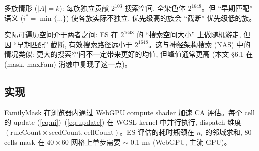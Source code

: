 多族情形 ($|A| = k$): 每族独立贡献 $2^{103}$ 搜索空间, 全染色体 $2^{1648}$。但 ``早期匹配'' 语义 ($i^* = \min\{\ldots\}$) 使各族实际不独立, 优先级高的族会 ``截断'' 优先级低的族。

实际可遍历空间介于两者之间: ES 在 $2^{1648}$ 的 ``搜索空间大小'' 上做随机游走, 但因 ``早期匹配'' 截断, 有效搜索路径远小于 $2^{1648}$。这与神经架构搜索 (NAS) 中的情况类似: 更大的搜索空间不一定带来更好的均值, 但峰值通常更高 (本文 §6.1 在 (mask, maxFam) 消融中复现了这一点)。

\subsection{实现}

FamilyMask 在浏览器内通过 WebGPU compute shader 加速 CA 评估。每个 cell 的 update (\ref{eq:ni})--(\ref{eq:update}) 在 WGSL kernel 中并行执行, dispatch 维度 $(\text{ruleCount} \times \text{seedCount}, \text{cellCount})$。ES 评估的耗时瓶颈在 $n_i$ 的邻域求和, 80 cells mask 在 $40 \times 60$ 网格上单步需要 $\sim$ 0.1 ms (WebGPU, 主流 GPU)。
